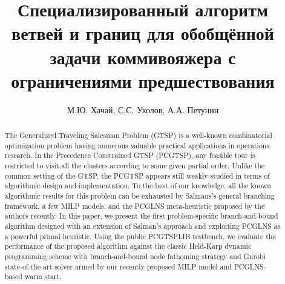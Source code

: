 \documentclass{article}
\author{М.Ю. Хачай, С.С. Уколов, А.А. Петунин}
\title{
Специализированный алгоритм ветвей и границ
для обобщённой задачи коммивояжера
с ограничениями предшествования
}
\begin{document}
\maketitle

\begin{abstract}
The Generalized Traveling Salesman Problem (GTSP) is a well-known combinatorial optimization problem having numerous valuable practical applications in operations research. In the Precedence Constrained GTSP (PCGTSP), any feasible tour is restricted to visit all the clusters according to some given partial order. Unlike the common setting of the GTSP, the PCGTSP appears still weakly studied in terms of algorithmic design and implementation.
To the best of our knowledge, all the known algorithmic results for this problem can be exhausted by Salmans's general branching framework, a few MILP models, and the PCGLNS meta-heuristic proposed by the authors recently. In this paper, we present the first problem-specific branch-and-bound algorithm designed with an extension of Salman's approach and exploiting PCGLNS as a powerful primal heuristic.   Using the public PCGTSPLIB testbench, we evaluate the performance of the proposed algorithm against the classic Held-Karp dynamic programming scheme with branch-and-bound node fathoming strategy and Gurobi state-of-the-art solver armed by our recently proposed MILP model and PCGLNS-based warm start. 
\end{abstract}  


% 







% 


\end{document}
